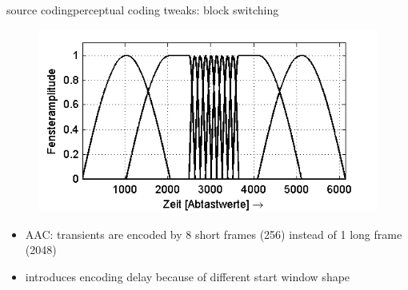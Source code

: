 	\begin{frame}{source coding}{perceptual coding tweaks: block switching}
			\begin{figure}
				\centering
					\includegraphics[scale=0.9]{Graph/Lerch16-4}
			\end{figure}
            \begin{itemize}
                \item   AAC: transients are encoded by 8 short frames (256) instead of 1 long frame (2048)
                \item   introduces encoding delay because of different start window shape
            \end{itemize}
	\end{frame}
    
